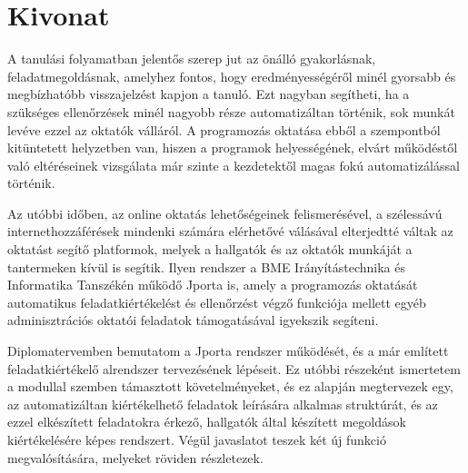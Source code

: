 \chapter*{Kivonat}

A tanulási folyamatban jelentős szerep jut az önálló gyakorlásnak, feladatmegoldásnak, amelyhez fontos, hogy eredményességéről minél gyorsabb és megbízhatóbb visszajelzést kapjon a tanuló.
Ezt nagyban segítheti, ha a szükséges ellenőrzések minél nagyobb része automatizáltan történik, sok munkát levéve ezzel az oktatók válláról.
A programozás oktatása ebből a szempontból kitüntetett helyzetben van, hiszen a programok helyességének, elvárt működéstől való eltéréseinek vizsgálata már szinte a kezdetektől magas fokú automatizálással történik.

Az utóbbi időben, az online oktatás lehetőségeinek felismerésével, a szélessávú internethozzáférések mindenki számára elérhetővé válásával elterjedtté váltak az oktatást segítő platformok, melyek a hallgatók és az oktatók munkáját a tantermeken kívül is segítik.
Ilyen rendszer a BME Irányítástechnika és Informatika Tanszékén működő Jporta is, amely a programozás oktatását automatikus feladatkiértékelést és ellenőrzést végző funkciója mellett egyéb adminisztrációs oktatói feladatok támogatásával igyekszik segíteni.

Diplomatervemben bemutatom a Jporta rendszer működését, és a már említett feladatkiértékelő alrendszer tervezésének lépéseit.
Ez utóbbi részeként ismertetem a modullal szemben támasztott követelményeket, és ez alapján megtervezek egy, az automatizáltan kiértékelhető feladatok leírására alkalmas struktúrát, és az ezzel elkészített feladatokra érkező, hallgatók által készített megoldások kiértékelésére képes rendszert.
Végül javaslatot teszek két új funkció megvalósítására, melyeket röviden részletezek.
\vfill

